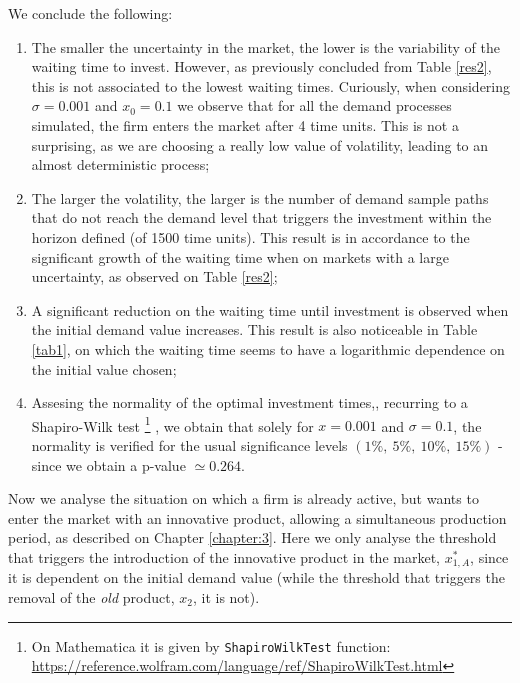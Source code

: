 We conclude the following:
\begin{enumerate}
	\item The smaller the uncertainty in the market, the lower is the variability of the waiting time to invest.
	However, as previously concluded from Table \ref{res2}, this is not associated to the lowest waiting times.
	Curiously, when considering $\sigma=0.001$ and $x_0=0.1$ we observe that for all the demand processes simulated, the firm enters the market after 4 time units. This is not a surprising, as we are choosing a really low value of volatility, leading to an almost deterministic process;
	
	\item The larger the volatility, the larger is the number of demand sample paths that do not reach the demand level that triggers the investment within the horizon defined (of 1500 time units). This result is in accordance to the significant growth of the waiting time when on markets with a large uncertainty, as observed on Table \ref{res2};
	
	\item A significant reduction on the waiting time until investment is observed when the initial demand value increases. This result is also noticeable in Table \ref{tab1}, on which the waiting time seems to have a logarithmic dependence on the initial value chosen;
	
	\item Assesing the normality of the optimal investment times,, recurring to a Shapiro-Wilk test \cite{sw}\footnote{On Mathematica it is given by \texttt{ShapiroWilkTest} function: \url{https://reference.wolfram.com/language/ref/ShapiroWilkTest.html}}
		, we obtain that solely for $x=0.001$ and $\sigma=0.1$, the normality is verified for the usual significance levels $(1\%, \ 5\%, \ 10\%, \ 15\%)$ - since we obtain a p-value $\simeq 0.264$.
\end{enumerate}


\vspace{3mm}
Now we analyse the situation on which a firm is already active, but wants to enter the market with an innovative product, allowing a simultaneous production period, as described on Chapter \ref{chapter:3}. Here we only analyse the threshold that triggers the introduction of the innovative product in the market, $x^*_{1,A}$, since it is dependent on the initial demand value (while the threshold that triggers the removal of the \textit{old} product, $x_2$, it is not).


